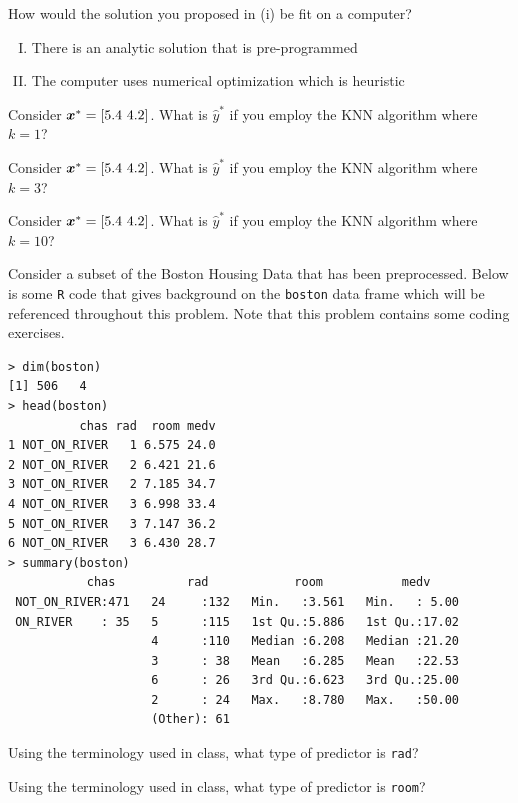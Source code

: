 \documentclass[12pt]{article}
\begin{document}
 How would the solution you proposed in (i) be fit on a computer?

\begin{enumerate}[I)]
\item There is an analytic solution that is pre-programmed
\item The computer uses numerical optimization which is heuristic
\end{enumerate}

 Consider $\boldsymbol{x}^* = \left[5.4~4.2\right]$. What is $\hat{y}^*$ if you employ the KNN algorithm where $k=1$? 

 Consider $\boldsymbol{x}^* = \left[5.4~4.2\right]$. What is $\hat{y}^*$ if you employ the KNN algorithm where $k=3$? 

 Consider $\boldsymbol{x}^* = \left[5.4~4.2\right]$. What is $\hat{y}^*$ if you employ the KNN algorithm where $k=10$? 
\eenum

\problem Consider a subset of the Boston Housing Data that has been preprocessed. Below is some \texttt{R} code that gives background on the \texttt{boston} data frame which will be referenced throughout this problem. Note that this problem contains some coding exercises. 

\begin{lstlisting}
> dim(boston)
[1] 506   4
> head(boston)
          chas rad  room medv
1 NOT_ON_RIVER   1 6.575 24.0
2 NOT_ON_RIVER   2 6.421 21.6
3 NOT_ON_RIVER   2 7.185 34.7
4 NOT_ON_RIVER   3 6.998 33.4
5 NOT_ON_RIVER   3 7.147 36.2
6 NOT_ON_RIVER   3 6.430 28.7
> summary(boston)
           chas          rad            room           medv      
 NOT_ON_RIVER:471   24     :132   Min.   :3.561   Min.   : 5.00  
 ON_RIVER    : 35   5      :115   1st Qu.:5.886   1st Qu.:17.02  
                    4      :110   Median :6.208   Median :21.20  
                    3      : 38   Mean   :6.285   Mean   :22.53  
                    6      : 26   3rd Qu.:6.623   3rd Qu.:25.00  
                    2      : 24   Max.   :8.780   Max.   :50.00  
                    (Other): 61 
\end{lstlisting}

\benum

 Using the terminology used in class, what type of predictor is \texttt{rad}? 

 Using the terminology used in class, what type of predictor is \texttt{room}? 
\end{document}

